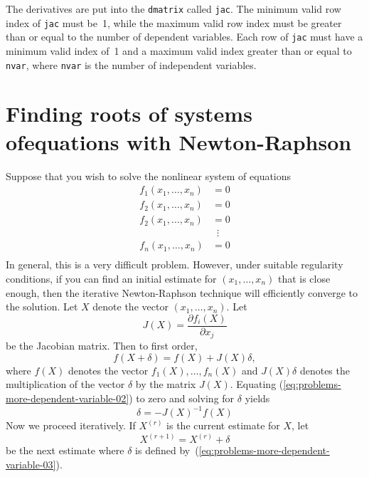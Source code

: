 \documentclass{admbmanual}
\begin{document}
The derivatives are put into the \texttt{dmatrix} called \texttt{jac}. The
minimum valid row index of \texttt{jac} must be~1, while the maximum valid row
index must be greater than or equal to the number of dependent variables. Each
row of \texttt{jac} must have a minimum valid index of~1 and a maximum valid
index greater than or equal to \texttt{nvar}, where \texttt{nvar} is the number
of independent variables.


\section {Finding roots of systems of\br equations with Newton-Raphson}
\label{sec:finding-roots}

Suppose that you wish to solve the nonlinear system of equations
\begin{align}\label{eq:problems-more-dependent-variable-01}
  \nonumber %
f_1(x_1,\ldots,x_n)&=0\\ \nonumber
f_2(x_1,\ldots,x_n)&=0\\
f_2(x_1,\ldots,x_n)&=0\\  \nonumber
& \,\,\,\vdots\\ \nonumber
f_n(x_1,\ldots,x_n)&=0\\ \nonumber
\end{align}
In general, this is a very difficult problem. However, under suitable regularity
conditions, if you can find an initial estimate for $(x_1,\ldots,x_n)$ that is
close enough, then the iterative Newton-Raphson technique will efficiently
converge to the solution. Let $X$ denote the vector $(x_1,\ldots,x_n)$. Let
\begin{equation*}
  J(X)=\frac{\partial f_i(X)}{\partial x_j}
\end{equation*}
be the Jacobian matrix. Then to first order,
\begin{equation}
  \label{eq:problems-more-dependent-variable-02} %
  f(X+\delta)=f(X)+J(X)\delta,
\end{equation}
where $f(X)$ denotes the vector $f_1(X),\ldots,f_n(X)$ and $J(X)\delta$ denotes
the multiplication of the vector $\delta$ by the matrix $J(X)$. Equating
(\ref{eq:problems-more-dependent-variable-02}) %
to zero and solving for $\delta$ yields
\begin{equation}
  \label{eq:problems-more-dependent-variable-03} %
  \delta=-J(X)^{-1}f(X)
\end{equation}
Now we proceed iteratively. If $X^{(r)}$ is the current estimate for $X$, let
\begin{equation*}
  X^{(r+1)}=X^{(r)} +\delta
\end{equation*}
be the next estimate where $\delta$ is defined
by~(\ref{eq:problems-more-dependent-variable-03}). %
\end{document}
